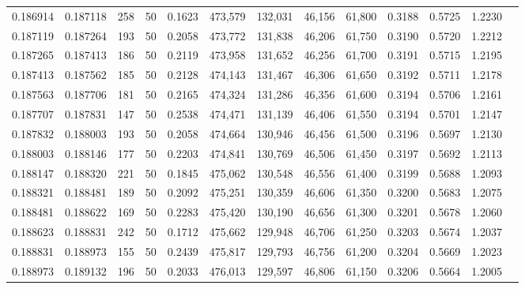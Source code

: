 \begin{tabular}{rrrrrrrrrrrrr}
0.186914 & 0.187118 &   258 &  50 &                                     0.1623 & 473,579 & 132,031 &  46,156 &  61,800 & 0.3188 & 0.5725 & 1.2230 \\
0.187119 & 0.187264 &   193 &  50 &                                     0.2058 & 473,772 & 131,838 &  46,206 &  61,750 & 0.3190 & 0.5720 & 1.2212 \\
0.187265 & 0.187413 &   186 &  50 &                                     0.2119 & 473,958 & 131,652 &  46,256 &  61,700 & 0.3191 & 0.5715 & 1.2195 \\
0.187413 & 0.187562 &   185 &  50 &                                     0.2128 & 474,143 & 131,467 &  46,306 &  61,650 & 0.3192 & 0.5711 & 1.2178 \\
0.187563 & 0.187706 &   181 &  50 &                                     0.2165 & 474,324 & 131,286 &  46,356 &  61,600 & 0.3194 & 0.5706 & 1.2161 \\
0.187707 & 0.187831 &   147 &  50 &                                     0.2538 & 474,471 & 131,139 &  46,406 &  61,550 & 0.3194 & 0.5701 & 1.2147 \\
0.187832 & 0.188003 &   193 &  50 &                                     0.2058 & 474,664 & 130,946 &  46,456 &  61,500 & 0.3196 & 0.5697 & 1.2130 \\
0.188003 & 0.188146 &   177 &  50 &                                     0.2203 & 474,841 & 130,769 &  46,506 &  61,450 & 0.3197 & 0.5692 & 1.2113 \\
0.188147 & 0.188320 &   221 &  50 &                                     0.1845 & 475,062 & 130,548 &  46,556 &  61,400 & 0.3199 & 0.5688 & 1.2093 \\
0.188321 & 0.188481 &   189 &  50 &                                     0.2092 & 475,251 & 130,359 &  46,606 &  61,350 & 0.3200 & 0.5683 & 1.2075 \\
0.188481 & 0.188622 &   169 &  50 &                                     0.2283 & 475,420 & 130,190 &  46,656 &  61,300 & 0.3201 & 0.5678 & 1.2060 \\
0.188623 & 0.188831 &   242 &  50 &                                     0.1712 & 475,662 & 129,948 &  46,706 &  61,250 & 0.3203 & 0.5674 & 1.2037 \\
0.188831 & 0.188973 &   155 &  50 &                                     0.2439 & 475,817 & 129,793 &  46,756 &  61,200 & 0.3204 & 0.5669 & 1.2023 \\
0.188973 & 0.189132 &   196 &  50 &                                     0.2033 & 476,013 & 129,597 &  46,806 &  61,150 & 0.3206 & 0.5664 & 1.2005 \\

\end{tabular}
